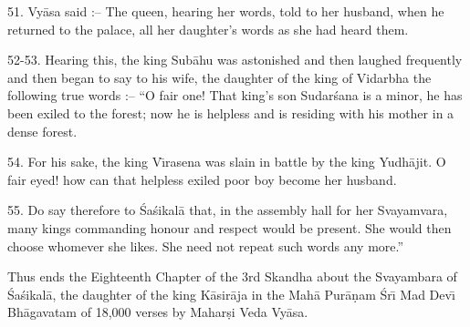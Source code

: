 51. Vy\=asa said :-- The queen, hearing her words, told to her husband, when he returned to the palace, all her daughter's words as she had heard them.

52-53. Hearing this, the king Sub\=ahu was astonished and then laughed frequently and then began to say to his wife, the daughter of the king of Vidarbha the following true words :-- ``O fair one! That king's son Sudar\'sana is a minor, he has been exiled to the forest; now he is helpless and is residing with his mother in a dense forest.

54. For his sake, the king V\={\i}rasena was slain in battle by the king Yudh\=ajit. O fair eyed! how can that helpless exiled poor boy become her husband.

55. Do say therefore to \'Sa\'sikal\=a that, in the assembly hall for her Svayamvara, many kings commanding honour and respect would be present. She would then choose whomever she likes. She need not repeat such words any more.''

Thus ends the Eighteenth Chapter of the 3rd Skandha about the Svayambara of \'Sa\'sikal\=a, the daughter of the king K\=asir\=aja in the Mah\=a Pur\=a\d{n}am \'Sr\={\i} Mad Dev\={\i} Bh\=agavatam of 18,000 verses by Mahar\d{s}i Veda Vy\=asa.



